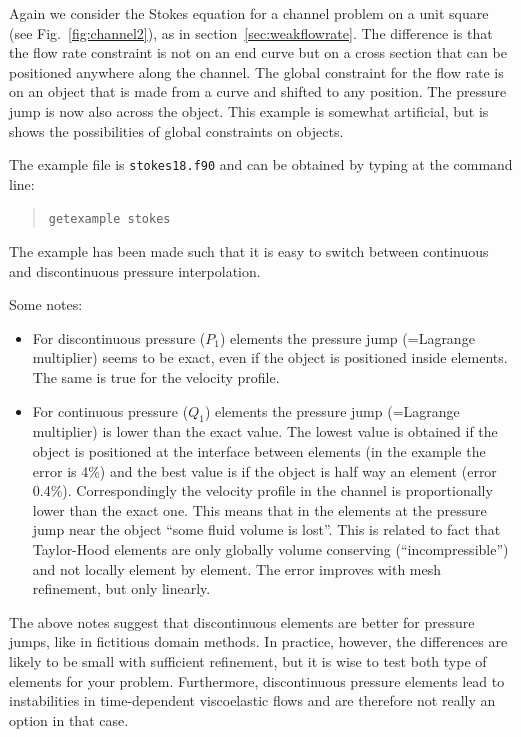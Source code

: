 Again we consider the Stokes equation for a channel problem on a unit square
(see Fig.~\ref{fig:channel2}), as in section~\ref{sec:weakflowrate}.
The difference is that the flow rate constraint is not on an end curve but on
a cross section that can be positioned anywhere along the channel.
The global constraint for the flow rate is on an object that is made from a
curve and shifted to any position. The pressure jump is now also across the
object. This example is somewhat artificial, but is shows the possibilities
of global constraints on objects.

The example file is \texttt{stokes18.f90} and can be obtained by typing at the
command line:
\begin{quote}
   \texttt{getexample stokes}
\end{quote}
The example has been made such that it is easy to switch between continuous
and discontinuous pressure interpolation.

Some notes:
\begin{itemize}
   \item For discontinuous pressure ($P_1$) elements the pressure jump
(=Lagrange multiplier) seems to be exact, even if the object is positioned
inside elements. The same is true for the velocity profile.
   \item For continuous pressure ($Q_1$) elements the pressure jump
(=Lagrange multiplier) is lower than the exact value. The lowest value
is obtained if the object is positioned at the interface between elements (in
the example the error is 4\%) and
the best value is if the object is half way an element (error 0.4\%).
Correspondingly the
velocity profile in the channel is proportionally lower than the exact one.
This means that in the elements at the pressure jump near the object
``some fluid volume is lost''. This is related to fact that
Taylor-Hood elements are
only globally volume conserving (``incompressible'')
and not locally element by element.
The error improves with mesh refinement, but only linearly.
\end{itemize}
The above notes suggest that discontinuous elements are better for pressure
jumps, like in fictitious domain methods. In practice, however,
the differences are likely to be small with sufficient refinement, but it is
wise to test both type of elements for your problem. Furthermore, discontinuous
pressure elements lead to instabilities in time-dependent viscoelastic flows
and are therefore not really an option in that case.
